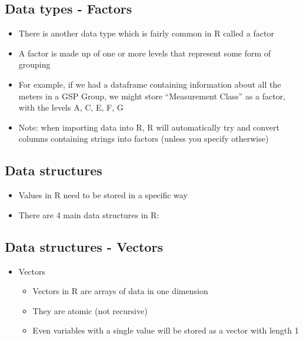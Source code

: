 \documentclass[]{article}
\providecommand{\tightlist}{%
  \setlength{\itemsep}{0pt}\setlength{\parskip}{0pt}}
\begin{document}
\subsection{Data types - Factors}\label{data-types---factors}

\begin{itemize}
\tightlist
\item
  There is another data type which is fairly common in R called a factor
\item
  A factor is made up of one or more levels that represent some form of
  grouping
\item
  For example, if we had a dataframe containing information about all
  the meters in a GSP Group, we might store ``Measurement Class'' as a
  factor, with the levels A, C, E, F, G
\item
  Note: when importing data into R, R will automatically try and convert
  columns containing strings into factors (unless you specify otherwise)
\end{itemize}

\subsection{Data structures}\label{data-structures}

\begin{itemize}
\tightlist
\item
  Values in R need to be stored in a specific way
\item
  There are 4 main data structures in R:
\end{itemize}

\subsection{Data structures - Vectors}\label{data-structures---vectors}

\begin{itemize}
\tightlist
\item
  Vectors

  \begin{itemize}
  \tightlist
  \item
    Vectors in R are arrays of data in one dimension
  \item
    They are atomic (not recursive)
  \item
    Even variables with a single value will be stored as a vector with
    length 1
  \end{itemize}
\end{itemize}
\end{document}
